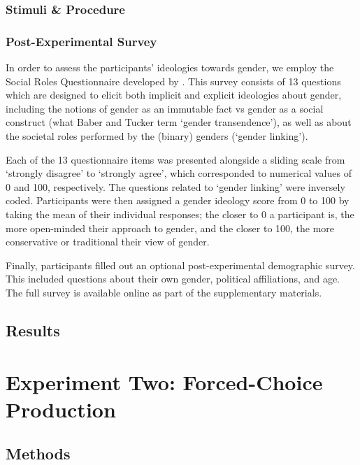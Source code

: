 \documentclass[10pt,letterpaper]{article}
\begin{document}
	\subsubsection{Stimuli \& Procedure}
	
	\subsubsection{Post-Experimental Survey} In order to assess the participants' ideologies towards gender, we employ the Social Roles Questionnaire developed by \textcite{baber2006social}. This survey consists of 13 questions which are designed to elicit both implicit and explicit ideologies about gender, including the notions of gender as an immutable fact vs gender as a social construct (what Baber and Tucker term `gender transendence'), as well as about the societal roles performed by the (binary) genders (`gender linking').\par 
	Each of the 13 questionnaire items was presented alongside a sliding scale from `strongly disagree' to `strongly agree', which corresponded to numerical values of 0 and 100, respectively. The questions related to `gender linking' were inversely coded. Participants were then assigned a gender ideology score from 0 to 100 by taking the mean of their individual responses; the closer to 0 a participant is, the more open-minded their approach to gender, and the closer to 100, the more conservative or traditional their view of gender.\par 
	Finally, participants filled out an optional post-experimental demographic survey. This included questions about their own gender, political affiliations, and age. The full survey is available online as part of the supplementary materials.
	\subsection{Results}
	
	\section{Experiment Two: Forced-Choice Production}
	\subsection{Methods}
\end{document}
